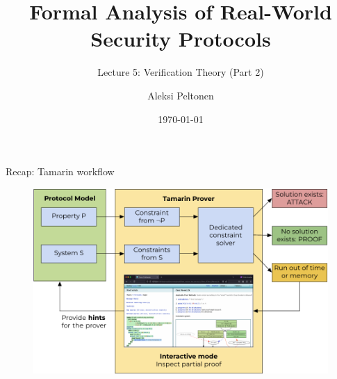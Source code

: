 \documentclass[11pt,aspectratio=169]{beamer}
\title{Formal Analysis of Real-World Security Protocols}
\subtitle{Lecture 5: Verification Theory (Part 2)}
\date{\today}
\author{Aleksi Peltonen}
\institute{CISPA Helmholtz Center for Information Security}
\begin{document}
\maketitle


\begin{frame}[fragile]{Recap: Tamarin workflow}
    \begin{figure}
        \includegraphics[width=.8\textwidth]
            {./figures/lecture_4/tamarin_workflow_8}%
    \end{figure}
\end{frame}
\end{document}
